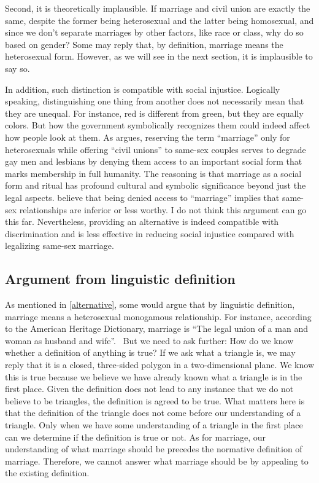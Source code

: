 \documentclass[man,floatsintext]{apa7}
\begin{document}
Second, it is theoretically implausible. If marriage and civil union are exactly the same, despite the former being heterosexual and the latter being homosexual, and since we don't separate marriages by other factors, like race or class, why do so based on gender? Some may reply that, by definition, marriage means the heterosexual form. However, as we will see in the next section, it is implausible to say so. 

In addition, such distinction is compatible with social injustice. Logically speaking, distinguishing one thing from another does not necessarily mean that they are unequal. For instance, red is different from green, but they are equally colors. But how the government symbolically recognizes them could indeed affect how people look at them. As \textcite{mohrLongArcJustice2007} argues, reserving the term ``marriage'' only for heterosexuals while offering ``civil unions'' to same-sex couples serves to degrade gay men and lesbians by denying them access to an important social form that marks membership in full humanity. The reasoning is that marriage as a social form and ritual has profound cultural and symbolic significance beyond just the legal aspects.  believe that being denied access to ``marriage'' implies that same-sex relationships are inferior or less worthy. I do not think this argument can go this far. Nevertheless, providing an alternative is indeed compatible with discrimination and is less effective in reducing social injustice compared with legalizing same-sex marriage.


\subsection{Argument from linguistic definition}

As mentioned in \ref{alternative}, some would argue that by linguistic definition, marriage means a heterosexual monogamous relationship. For instance, according to the American Heritage Dictionary, marriage is ``The legal union of a man and woman as husband and wife''.~\autocite{pickertAmericanHeritageDictionary2000} But we need to ask further: How do we know whether a definition of anything is true? If we ask what a triangle is, we may reply that it is a closed, three-sided polygon in a two-dimensional plane. We know this is true because we believe we have already known what a triangle is in the first place. Given the definition does not lead to any instance that we do not believe to be triangles, the definition is agreed to be true. What matters here is that the definition of the triangle does not come before our understanding of a triangle. Only when we have some understanding of a triangle in the first place can we determine if the definition is true or not. As for marriage, our understanding of what marriage should be precedes the normative definition of marriage. Therefore, we cannot answer what marriage should be by appealing to the existing definition.
\end{document}
